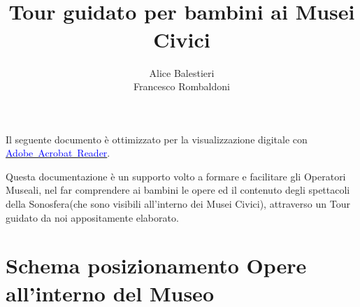 \documentclass[hidelinks,12pt,a4paper]{article}
\begin{document}
	\begin{flushleft}

	\LARGE
	
	\title{\textbf{\\Tour guidato per bambini ai Musei Civici}}
	\author{Alice Balestieri\\Francesco Rombaldoni}
	\date{}
	
	\maketitle
	
	\begin{adjustwidth}{-30mm}{-30mm}
		\vspace*{\fill}
		\centering
		\fboxrule=2pt
		\fbox
		{
			\begin{minipage}{0.85\linewidth}
				Il seguente documento è ottimizzato per la visualizzazione digitale con \href{https://get.adobe.com/it/reader/}{\textcolor{blue}{Adobe~Acrobat~Reader}}.  
			\end{minipage}
		}
	\end{adjustwidth}
	
	\setcounter{page}{1}
	\newpage
	\vspace*{\fill}
	Questa documentazione è un supporto volto a formare e facilitare gli Operatori Museali, nel far comprendere ai bambini le opere ed il contenuto degli spettacoli della Sonosfera(che sono visibili all'interno dei Musei Civici), attraverso un Tour guidato da noi appositamente elaborato.
	\vspace*{\fill}
	\newpage
	\tableofcontents
	\newpage
	
	\section{Schema posizionamento Opere all'interno del Museo}
	
	\begin{center}
	\end{center}
	

\end{flushleft}
\end{document}

